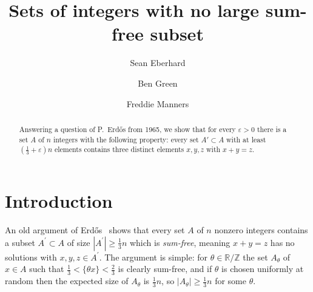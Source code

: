 \documentclass[10pt,reqno]{amsart}
\theoremstyle{definition}
\theoremstyle{remark}
\renewcommand{\geq}{\geqslant}
\def\R{\mathbb{R}}
\def\Z{\mathbb{Z}}
\def\eps{\varepsilon}
\numberwithin{equation}{section}
\begin{document}
\title[Sets of integers with no large sum-free subset]{Sets of integers with no large sum-free subset}



\author{Sean Eberhard}
\address{Centre for Mathematical Sciences, Wilberforce Road, Cambridge CB3 0WA}

\author{Ben Green}
\address{Centre for Mathematical Sciences, Wilberforce Road, Cambridge CB3 0WA}

\author{Freddie Manners}
\address{Centre for Mathematical Sciences, Wilberforce Road, Cambridge CB3 0WA}


\onehalfspace


\begin{abstract}
Answering a question of P.~Erd\H{o}s from 1965, we show that for every $\eps > 0$ there is a set $A$ of $n$ integers with the following property: every set $A' \subset A$ with at least $\left(\frac{1}{3} + \eps\right) n$ elements contains three distinct elements $x,y,z$ with $x + y = z$.
\end{abstract}

\maketitle

\tableofcontents

\section{Introduction}

\label{sec1}


An old argument of Erd\H{o}s~\cite{erdos1} shows that every set $A$ of $n$ nonzero integers contains a subset $A^\prime\subset A$ of size $|A^\prime|\geq \frac{1}{3}n$ which is \emph{sum-free}, meaning $x+y=z$ has no solutions with $x,y,z\in A^\prime$. The argument is simple: for $\theta\in\R/\Z$ the set $A_\theta$ of $x\in A$ such that $\frac{1}{3}<\{\theta x\}<\frac{2}{3}$ is clearly sum-free, and if $\theta$ is chosen uniformly at random then the expected size of $A_\theta$ is $\frac{1}{3}n$, so $|A_\theta|\geq\frac{1}{3}n$ for some $\theta$.
\end{document}
